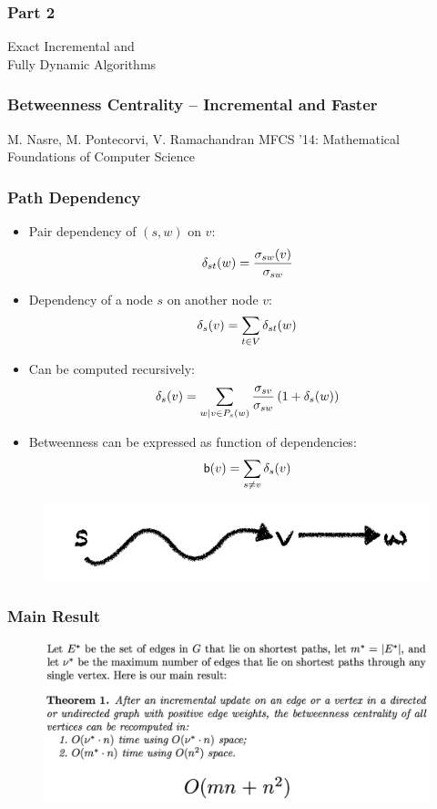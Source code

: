 
\begin{frame}
  \frametitle{Part 2}
  \centering
  \Huge Exact Incremental and \\ Fully Dynamic Algorithms
\end{frame}


\begin{frame}
  \frametitle{Betweenness Centrality -- Incremental and Faster}
  \centering
  \vfill
  {\huge M. Nasre, M. Pontecorvi, V. Ramachandran}
  \vfill
  {\large MFCS '14: Mathematical Foundations of Computer Science}
\end{frame}


\begin{frame}
  \frametitle{Path Dependency}
  
  \begin{itemize}
    \item Pair dependency of $(s,w)$ on $v$:
      \[\delta_{st}(w)=\frac{\sigma_{sw}(v)}{\sigma_{sw}}\]
    \item Dependency of a node $s$ on another node $v$:
      \[\delta_s(v)=\sum_{t \in V}\delta_{st}(w)\]
    \item Can be computed recursively:
    \[
    \delta_s(v)=\sum_{w \mid v \in P_s(w) } \frac{\sigma_{sv}}{\sigma_{sw}} \left( 1 + \delta_{s}(w) \right)
    \]
    \item Betweenness can be expressed as function of dependencies:
      \[ \mathsf{b}(v) = \sum_{s \neq v} \delta_s(v) \]
  \end{itemize}
  
  \begin{figure}[H]
    \centering
    \includegraphics[scale=1]{imgs/path-dependency}
  \end{figure}
\end{frame}


\begin{frame}
  \frametitle{Main Result}

  \begin{figure}[H]
    \centering
    \includegraphics[width=\textwidth]{imgs/npr14-main-result}
  \end{figure}
\end{frame}


